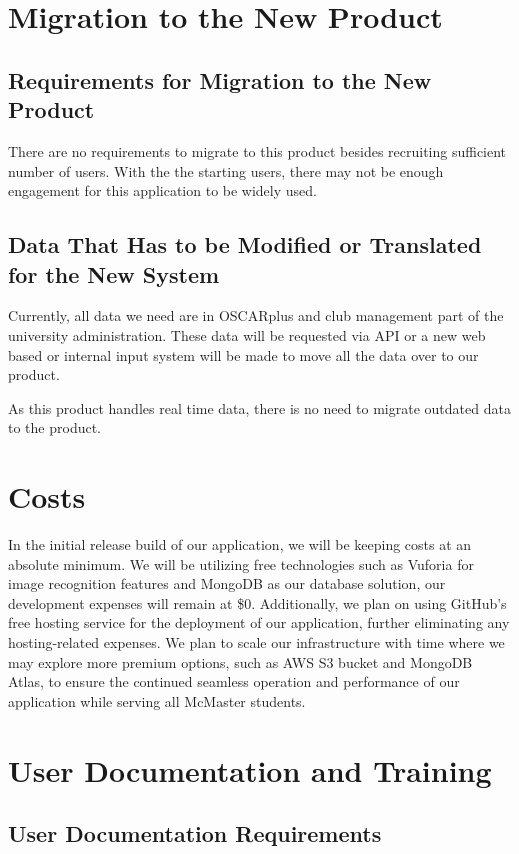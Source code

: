 \documentclass[12pt]{article}
\begin{document}
\section{Migration to the New Product}
\subsection{Requirements for Migration to the New Product}

\qquad There are no requirements to migrate to this product besides recruiting sufficient number of users.
With the the starting users, there may not be enough engagement for this application to be widely used.

\subsection{Data That Has to be Modified or Translated for the New System}

\qquad Currently, all data we need are in OSCARplus and club management part of the university administration.
These data will be requested via API or a new web based or internal input system will be made to move all the data over to our product.

As this product handles real time data, there is no need to migrate outdated data to the product.

\section{Costs}

In the initial release build of our application, we will be keeping costs at an absolute minimum. We will be utilizing free technologies such as Vuforia for image recognition features and MongoDB as our database solution, our development expenses will remain at \$0. Additionally, we plan on using GitHub's free hosting service for the deployment of our application, further eliminating any hosting-related expenses. We plan to scale our infrastructure with time where we may explore more premium options, such as AWS S3 bucket and MongoDB Atlas, to ensure the continued seamless operation and performance of our application while serving all McMaster students.

\section{User Documentation and Training}
\subsection{User Documentation Requirements}
\end{document}
